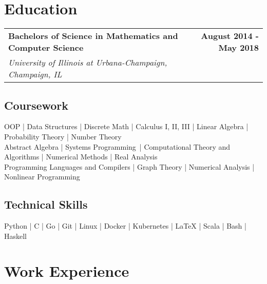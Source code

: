 \documentclass[letterpaper]{article}
\begin{document}
  \setcounter{secnumdepth}{0}

  \section{Education}

  \noindent
  \begin{tabularx}{\textwidth}{@{}X r@{}}
    \textbf{Bachelors of Science in Mathematics and Computer Science} & \textbf{August 2014 - May 2018} \\
    \textit{University of Illinois at Urbana-Champaign, Champaign, IL} &
  \end{tabularx}
   
  \subsection{Coursework}
  \noindent OOP | Data Structures | Discrete Math | Calculus I, II, III | Linear Algebra | Probability Theory | Number Theory \\ 
  Abstract Algebra | Systems Programming \,| Computational Theory and Algorithms | Numerical Methods | Real Analysis \\ Programming Languages and Compilers |  Graph Theory | Numerical Analysis | Nonlinear Programming  
  \subsection{Technical Skills}
   \noindent Python | C | Go | Git | Linux | Docker | Kubernetes | LaTeX | Scala | Bash | Haskell

  \section{Work Experience}
  
\end{document}
